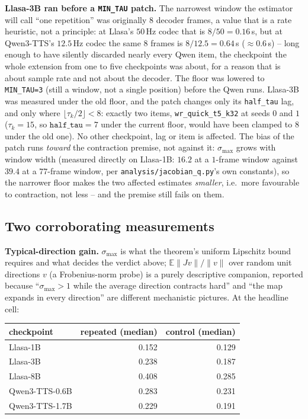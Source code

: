 \documentclass[11pt]{article}
\begin{document}
\noindent\textbf{Llasa-3B ran before a \texttt{MIN\_TAU} patch.} The narrowest
window the estimator will call ``one repetition'' was originally $8$ decoder
frames, a value that is a rate heuristic, not a principle: at Llasa's $50\,$Hz
codec that is $8/50=0.16\,$s, but at Qwen3-TTS's $12.5\,$Hz codec the same $8$
frames is $8/12.5=0.64\,$s ($\approx0.6\,$s) -- long enough to have silently
discarded nearly every Qwen item, the checkpoint the whole extension from one
to five checkpoints was about, for a reason that is about sample rate and not
about the decoder. The floor was lowered to \texttt{MIN\_TAU=3} (still a
window, not a single position) before the Qwen runs. Llasa-3B was measured
under the old floor, and the patch changes only its \texttt{half\_tau} lag, and
only where $\lfloor\tau_k/2\rfloor<8$: exactly two items,
\texttt{wr\_quick\_t5\_k32} at seeds $0$ and $1$ ($\tau_k=15$, so
$\texttt{half\_tau}=7$ under the current floor, would have been clamped to $8$
under the old one). No other checkpoint, lag or item is affected. The bias of
the patch runs \emph{toward} the contraction premise, not against it: $\sigma_{\max}$
grows with window width (measured directly on Llasa-1B: $16.2$ at a
$1$-frame window against $39.4$ at a $77$-frame window, per
\texttt{analysis/jacobian\_q.py}'s own constants), so the narrower floor makes
the two affected estimates \emph{smaller}, i.e.\ more favourable to
contraction, not less -- and the premise still fails on them.

\subsection{Two corroborating measurements}
\label{sec:s5-jacobian-corrob}

\noindent\textbf{Typical-direction gain.} $\sigma_{\max}$ is what the
theorem's uniform Lipschitz bound requires and what decides the verdict above;
$\mathbb{E}\lVert Jv\rVert/\lVert v\rVert$ over random unit directions $v$ (a
Frobenius-norm probe) is a purely descriptive companion, reported because
``$\sigma_{\max}>1$ while the average direction contracts hard'' and ``the map
expands in every direction'' are different mechanistic pictures. At the
headline cell:

\begin{center}
\begin{tabular}{lrr}
\toprule
checkpoint & repeated (median) & control (median) \\
\midrule
Llasa-1B & 0.152 & 0.129 \\
Llasa-3B & 0.238 & 0.187 \\
Llasa-8B & 0.408 & 0.285 \\
Qwen3-TTS-0.6B & 0.283 & 0.231 \\
Qwen3-TTS-1.7B & 0.229 & 0.191 \\
\bottomrule
\end{tabular}
\end{center}
\end{document}
